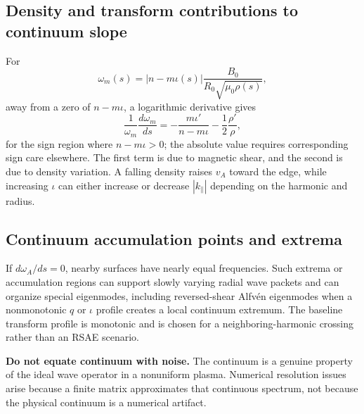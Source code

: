 \subsection{Density and transform contributions to continuum slope}
For
\begin{equation}
\omega_m(s)=|n-m\iota(s)|\frac{B_0}{R_0\sqrt{\mu_0\rho(s)}},
\end{equation}
away from a zero of $n-m\iota$, a logarithmic derivative gives
\begin{equation}
\frac{1}{\omega_m}\frac{d\omega_m}{ds}
=-\frac{m\iota'}{n-m\iota}-\frac{1}{2}\frac{\rho'}{\rho},
\label{eq:continuum_log_slope}
\end{equation}
for the sign region where $n-m\iota>0$; the absolute value requires corresponding sign care elsewhere. The first term is due to magnetic shear, and the second is due to density variation. A falling density raises $v_A$ toward the edge, while increasing $\iota$ can either increase or decrease $|k_\parallel|$ depending on the harmonic and radius.

\subsection{Continuum accumulation points and extrema}
If $d\omega_A/ds=0$, nearby surfaces have nearly equal frequencies. Such extrema or accumulation regions can support slowly varying radial wave packets and can organize special eigenmodes, including reversed-shear Alfv\'en eigenmodes when a nonmonotonic $q$ or $\iota$ profile creates a local continuum extremum. The baseline transform profile is monotonic and is chosen for a neighboring-harmonic crossing rather than an RSAE scenario.

\begin{notebox}
\textbf{Do not equate continuum with noise.} The continuum is a genuine property of the ideal wave operator in a nonuniform plasma. Numerical resolution issues arise because a finite matrix approximates that continuous spectrum, not because the physical continuum is a numerical artifact.
\end{notebox}

